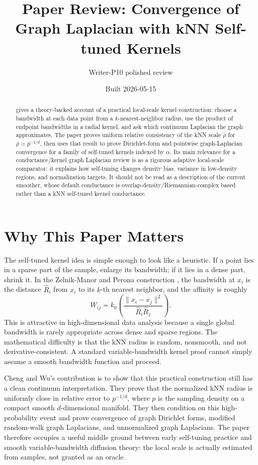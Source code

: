 \documentclass[11pt]{article}
\title{Paper Review: Convergence of Graph Laplacian with kNN Self-tuned Kernels}
\author{Writer-P10 polished review}
\date{Built 2026-05-15}
\begin{document}
\maketitle

\begin{abstract}
\citet{cheng2022knn} gives a theory-backed account of a practical local-scale
kernel construction: choose a bandwidth at each data point from a
\(k\)-nearest-neighbor radius, use the product of endpoint bandwidths in a
radial kernel, and ask which continuum Laplacian the graph approximates. The
paper proves uniform relative consistency of the kNN scale
\(\widehat\rho\) for \(\bar\rho=p^{-1/d}\), then uses that result to prove
Dirichlet-form and pointwise graph-Laplacian convergence for a family of
self-tuned kernels indexed by \(\alpha\). Its main relevance for a
conductance/kernel graph Laplacian review is as a rigorous adaptive
local-scale comparator: it explains how self-tuning changes density bias,
variance in low-density regions, and normalization targets. It should not be
read as a description of the current  smoother,
whose default conductance is overlap-density/Riemannian-complex based rather
than a kNN self-tuned kernel conductance.
\end{abstract}

\section{Why This Paper Matters}

The self-tuned kernel idea is simple enough to look like a heuristic. If a
point lies in a sparse part of the sample, enlarge its bandwidth; if it lies
in a dense part, shrink it. In the Zelnik-Manor and Perona construction
\citep{zelnikmanor2004selftuning}, the bandwidth at \(x_i\) is the distance
\(\widehat R_i\) from \(x_i\) to its \(k\)-th nearest neighbor, and the
affinity is roughly
\[
  W_{ij}=k_0\!\left(\frac{\|x_i-x_j\|^2}{\widehat R_i\widehat R_j}\right).
\]
This is attractive in high-dimensional data analysis because a single global
bandwidth is rarely appropriate across dense and sparse regions. The
mathematical difficulty is that the kNN radius is random, nonsmooth, and not
derivative-consistent. A standard variable-bandwidth kernel proof cannot
simply assume a smooth bandwidth function and proceed.

Cheng and Wu's contribution is to show that this practical construction still
has a clean continuum interpretation. They prove that the normalized kNN
radius is uniformly close in relative error to \(p^{-1/d}\), where \(p\) is
the sampling density on a compact smooth \(d\)-dimensional manifold. They
then condition on this high-probability event and prove convergence of graph
Dirichlet forms, modified random-walk graph Laplacians, and unnormalized
graph Laplacians. The paper therefore occupies a useful middle ground between
early self-tuning practice and smooth variable-bandwidth diffusion theory:
the local scale is actually estimated from samples, not granted as an oracle.
\end{document}

